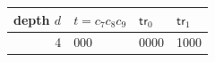 \begin{tabular}{r l l l}%
\hline%
\textbf{depth $d$}&\textbf{$t=c_7c_8c_9$}&\textbf{$\mathsf{tr}_0$}&\textbf{$\mathsf{tr}_1$}\\%
\hline%
4&000&0000&1000\\%
\hline%
\end{tabular}
